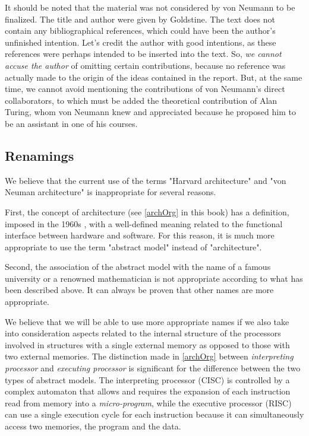 It should be noted that the material was not considered by von Neumann to be finalized. The title and author were given by Goldstine. The text does not contain any bibliographical references, which could have been the author's unfinished intention. Let's credit the author with good intentions, as these references were perhaps intended to be inserted into the text. So, {\em we cannot accuse the author} of omitting certain contributions, because no reference was actually made to the origin of the ideas contained in the report. But, at the same time, we cannot avoid mentioning the contributions of von Neumann's direct collaborators, to which must be added the theoretical contribution of Alan Turing, whom von Neumann knew and appreciated because he proposed him to be an assistant in one of his courses.

\subsection{Renamings}

We believe that the current use of the terms "Harvard architecture" and "von Neuman architecture" is inappropriate for several reasons.

First, the concept of architecture (see \ref{archOrg} in this book) has a definition, imposed in the 1960s \cite{Amdahl64}, with a well-defined meaning related to the functional interface between hardware and software. For this reason, it is much more appropriate to use the term "abstract model" instead of "architecture".

Second, the association of the abstract model with the name of a famous university or a renowned mathematician is not appropriate according to what has been described above. It can always be proven that other names are more appropriate.

We believe that we will be able to use more appropriate names if we also take into consideration aspects related to the internal structure of the processors involved in structures with a single external memory as opposed to those with two external memories. The distinction made in \ref{archOrg} between {\em interpreting processor} and {\em executing processor} is significant for the difference between the two types of abstract models. The interpreting processor (CISC) is controlled by a complex automaton that allows and requires the expansion of each instruction read from memory into a {\em micro-program}, while the executive processor (RISC) can use a single execution cycle for each instruction because it can simultaneously access two memories, the program and the data.


